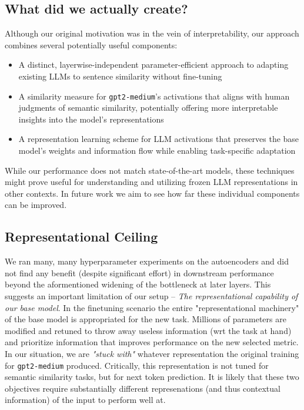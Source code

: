 \documentclass[14pt]{article}
\begin{document}
\subsection{What did we actually create?}
Although our original motivation was in the vein of interpretability, our approach combines several potentially useful components:
\begin{itemize}
    \item A distinct, layerwise-independent parameter-efficient approach to adapting existing LLMs to sentence similarity without fine-tuning
    \item A similarity measure for \verb|gpt2-medium|'s activations that aligns with human judgments of semantic similarity, potentially offering more interpretable insights into the model's representations
    \item A representation learning scheme for LLM activations that preserves the base model's weights and information flow while enabling task-specific adaptation
\end{itemize}
While our performance does not match state-of-the-art models, these techniques might prove useful for understanding and utilizing frozen LLM representations in other contexts. In future work we aim to see how far these individual components can be improved.

\subsection{Representational Ceiling}
We ran many, many hyperparameter experiments on the autoencoders and did not find any benefit (despite significant effort) in downstream performance beyond the aformentioned widening of the bottleneck at later layers. This suggests an important limitation of our setup -- \textit{The representational capability of our base model}. In the finetuning scenario the entire "representational machinery" of the base model is appropriated for the new task. Millions of parameters are modified and retuned to throw away useless information (wrt the task at hand) and prioritize information that improves performance on the new selected metric. In our situation, we are \textit{"stuck with"} whatever representation the original training for \verb|gpt2-medium| produced. Critically, this representation is not tuned for semantic similarity tasks, but for next token prediction. It is likely that these two objectives require substantially different represenations (and thus contextual information) of the input to perform well at.
\end{document}
